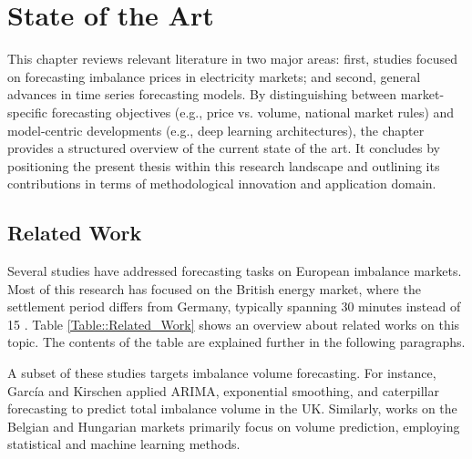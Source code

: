 \documentclass[class=scrbook, crop=false]{standalone}
\begin{document}
\chapter{State of the Art}
\label{Chapter::State_of_the_Art} %
This chapter reviews relevant literature in two major areas: first, studies focused on forecasting imbalance prices in electricity markets; and second, general advances in time series forecasting models. 
By distinguishing between market-specific forecasting objectives (e.g., price vs. volume, national market rules) and model-centric developments (e.g., deep learning architectures), the chapter provides a structured overview of the current state of the art.
 It concludes by positioning the present thesis within this research landscape and outlining its contributions in terms of methodological innovation and application domain.

\section{Related Work}
\label{Section::Related_Work}
Several studies have addressed forecasting tasks on European imbalance markets. Most of this research has focused on the British energy market, where the settlement period differs from Germany, typically spanning 30 minutes instead of 15 \cite{narajewskiProbabilisticForecastingGerman2022} \cite{limaBayesianPredictiveDistributions2023}. Table \ref{Table::Related_Work} shows an overview about related works on this topic. The contents of the table are explained further in the following paragraphs.

A subset of these studies targets imbalance volume forecasting. For instance, García and Kirschen \cite{garciaForecastingSystemImbalance2006} applied ARIMA, exponential smoothing, and caterpillar forecasting to predict total imbalance volume in the UK. Similarly, works on the Belgian \cite{bottieauVeryShortTermProbabilisticForecasting2020} \cite{dumasProbabilisticForecastingImbalance2019} and Hungarian  \cite{balazsShorttermSystemImbalance2024} markets primarily focus on volume prediction, employing statistical and machine learning methods.
\end{document}
